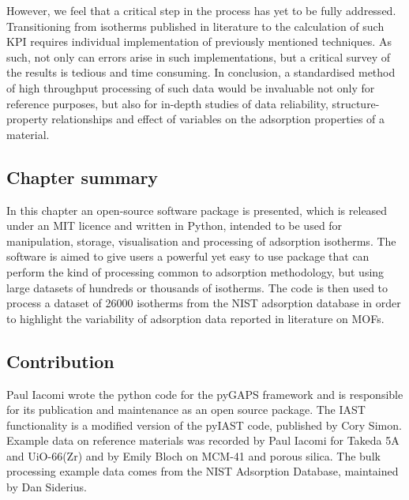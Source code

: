 However, we feel that a critical step in the process has yet
to be fully addressed. Transitioning from isotherms published in
literature to the calculation of such \gls{KPI} requires individual
implementation of previously mentioned techniques. As such,
not only can errors arise in such implementations, but
a critical survey of the results is tedious and time consuming.
In conclusion, a standardised method of high throughput processing
of such data would be invaluable not only for reference purposes,
but also for in-depth studies of data reliability,
structure-property relationships and effect of variables on
the adsorption properties of a material.

\subsection*{Chapter summary}

In this chapter an open-source software package is presented, which
is released under an MIT licence and written in Python, intended to be
used for manipulation, storage, visualisation and processing of
adsorption isotherms. The software is aimed to give users a powerful
yet easy to use package that can perform the kind of processing
common to adsorption methodology, but using large datasets of hundreds
or thousands of isotherms. The code is then used to process a
dataset of 26000 isotherms from the NIST adsorption database in order
to highlight the variability of adsorption data reported in literature
on \glspl{MOF}.

\subsection*{Contribution}

Paul Iacomi wrote the python code for the pyGAPS framework and is
responsible for its publication and maintenance as an open source
package. The \gls{IAST} functionality is a modified version of
the pyIAST code, published by Cory Simon. Example data on reference 
materials was recorded by Paul Iacomi for Takeda 5A and UiO-66(Zr) 
and by Emily Bloch on MCM-41 and porous silica. The bulk processing
example data comes from the NIST Adsorption Database, 
maintained by Dan Siderius.
